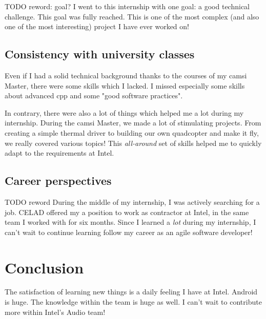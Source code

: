 TODO reword: goal?
I went to this internship with one goal: a good technical challenge. This goal
was fully reached. This is one of the most complex (and also one of the most
interesting) project I have ever worked on!

\subsection{Consistency with university classes}
Even if I had a solid technical background thanks to the courses of my
\gls{camsi} Master, there were some skills which I lacked.
I missed especially some skills about advanced \gls{cpp} and some "good software practices".

In contrary, there were also a lot of things which helped me a lot during
my internship.  During the \gls{camsi} Master, we made a lot of stimulating
projects. From creating a simple thermal driver to building our own quadcopter
and make it fly, we really covered various topics! This \emph{all-around} set of
skills helped me to quickly adapt to the requirements at Intel.

\subsection{Career perspectives}
TODO reword
During the middle of my internship, I was actively searching for a job. CELAD offered my a position to work
as contractor at Intel, in the same team I worked with for six months.
Since I learned a \emph{lot} during my internship, I can't wait to continue learning follow my career
as an agile software developer!

\section{Conclusion}
The satisfaction of learning new things is a daily feeling I have at
Intel. Android is huge. The knowledge within the team is huge as well. I can't
wait to contribute more within Intel's Audio team!
